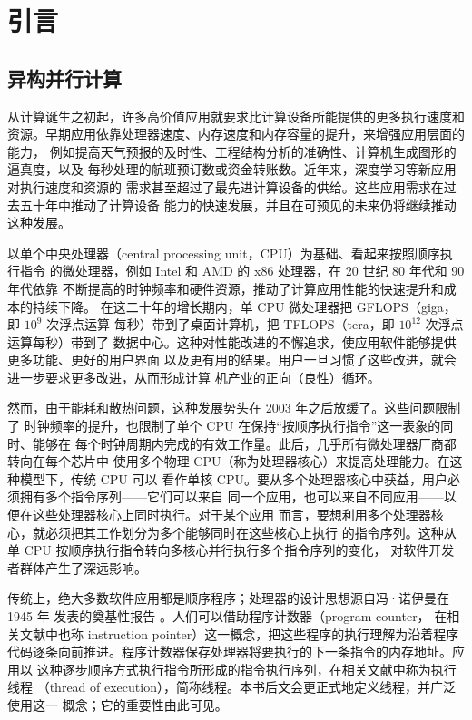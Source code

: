\chapter{引言}
\label{chap:introduction}

\section{异构并行计算}
\label{sec:heterogeneous-parallel-computing}

从计算诞生之初起，许多高价值应用就要求比计算设备所能提供的更多执行速度和
资源。早期应用依靠处理器速度、内存速度和内存容量的提升，来增强应用层面的能力，
例如提高天气预报的及时性、工程结构分析的准确性、计算机生成图形的逼真度，以及
每秒处理的航班预订数或资金转账数。近年来，深度学习等新应用对执行速度和资源的
需求甚至超过了最先进计算设备的供给。这些应用需求在过去五十年中推动了计算设备
能力的快速发展，并且在可预见的未来仍将继续推动这种发展。

以单个中央处理器（central processing unit，CPU）为基础、看起来按照顺序执行指令
的微处理器，例如 Intel 和 AMD 的 x86 处理器，在 20 世纪 80 年代和 90 年代依靠
不断提高的时钟频率和硬件资源，推动了计算应用性能的快速提升和成本的持续下降。
在这二十年的增长期内，单 CPU 微处理器把 GFLOPS（giga，即 $10^9$ 次浮点运算
每秒）带到了桌面计算机，把 TFLOPS（tera，即 $10^{12}$ 次浮点运算每秒）带到了
数据中心。这种对性能改进的不懈追求，使应用软件能够提供更多功能、更好的用户界面
以及更有用的结果。用户一旦习惯了这些改进，就会进一步要求更多改进，从而形成计算
机产业的正向（良性）循环。

然而，由于能耗和散热问题，这种发展势头在 2003 年之后放缓了。这些问题限制了
时钟频率的提升，也限制了单个 CPU 在保持“按顺序执行指令”这一表象的同时、能够在
每个时钟周期内完成的有效工作量。此后，几乎所有微处理器厂商都转向在每个芯片中
使用多个物理 CPU（称为处理器核心）来提高处理能力。在这种模型下，传统 CPU 可以
看作单核 CPU。要从多个处理器核心中获益，用户必须拥有多个指令序列——它们可以来自
同一个应用，也可以来自不同应用——以便在这些处理器核心上同时执行。对于某个应用
而言，要想利用多个处理器核心，就必须把其工作划分为多个能够同时在这些核心上执行
的指令序列。这种从单 CPU 按顺序执行指令转向多核心并行执行多个指令序列的变化，
对软件开发者群体产生了深远影响。

传统上，绝大多数软件应用都是顺序程序；处理器的设计思想源自冯·诺伊曼在 1945 年
发表的奠基性报告 \cite{vonneumann1993}。人们可以借助程序计数器（program counter，
在相关文献中也称 instruction pointer）这一概念，把这些程序的执行理解为沿着程序
代码逐条向前推进。程序计数器保存处理器将要执行的下一条指令的内存地址。应用以
这种逐步顺序方式执行指令所形成的指令执行序列，在相关文献中称为执行线程
（thread of execution），简称线程。本书后文会更正式地定义线程，并广泛使用这一
概念；它的重要性由此可见。

